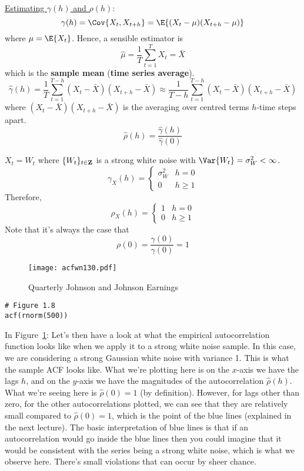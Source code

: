 \underline{Estimating $ \gamma(h) $ and $ \rho(h) $}:
\[ \gamma(h)=\Cov{X_t,X_{t+h}}=\E{(X_t-\mu)(X_{t+h}-\mu)} \]
where $ \mu=\E{X_t} $. Hence, a sensible estimator is
\[ \hat{\mu}=\frac{1}{T} \sum_{t=1}^{T} X_t=\bar{X} \]
which is the \textbf{sample mean} (\textbf{time series average}).
\[ \hat{\gamma}(h)=\frac{1}{T} \sum_{t=1}^{T-h}(X_t-\bar{X})(X_{t+h}-\bar{X})
    \approx \frac{1}{T-h} \sum_{t=1}^{T-h}(X_t-\bar{X})(X_{t+h}-\bar{X})  \]
where $ (X_t-\bar{X})(X_{t+h}-\bar{X}) $ is the averaging over
centred terms $ h $-time steps apart.
\[ \hat{\rho}(h)=\frac{\hat{\gamma}(h)}{\hat{\gamma}(0)}  \]
\begin{Example}{}{}
    $ X_t=W_t $ where $ \{W_t\}_{t\in\mathbf{Z}} $ is a strong white noise
    with $ \Var{W_t}=\sigma_W^2<\infty $.
    \[ \gamma_X(h)=\begin{cases}
            \sigma_W^2 & h=0    \\
            0          & h\ge 1
        \end{cases} \]
    Therefore,
    \[ \rho_X(h)=\begin{cases}
            1 & h=0    \\
            0 & h\ge 1
        \end{cases} \]
    Note that it's always the case that
    \[ \rho(0)=\frac{\gamma(0)}{\gamma(0)}=1  \]
\end{Example}
\begin{figure}[!ht]
    \centering
    \texttt{[image: acfwn130.pdf]}
    \caption{Quarterly Johnson and Johnson Earnings}\label{fig:acfwn130}
\end{figure}
\begin{verbatim}
# Figure 1.8
acf(rnorm(500))
\end{verbatim}
In Figure~\ref{fig:acfwn130}:
{\color{blue}Let's then have a look at what the empirical autocorrelation
function looks like when we apply it to a strong white noise sample.
In this case, we are considering a strong Gaussian white noise
with variance 1. This is what the sample ACF looks like.
What we're plotting here is on the $ x $-axis we have the lags $ h $,
and on the $ y $-axis we have the magnitudes of the autocorrelation $ \hat{\rho}(h) $.
What we're seeing here
is $ \hat{\rho}(0)=1 $ (by definition). However, for lags other than zero,
for the other autocorrelations plotted, we can see that they are
relatively small compared to $ \hat{\rho}(0)=1 $,
which is the point of the blue lines (explained
in the next lecture). The basic interpretation of blue lines is that
if an autocorrelation would go inside the blue lines then you could imagine
that it would be consistent with the series being a strong white noise,
which is what we observe here. There's small violations that can occur by
sheer chance.}
